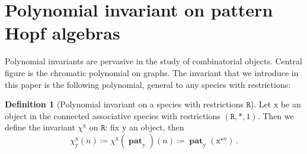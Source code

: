 \documentclass[submission]{FPSAC2023}
\theoremstyle{definition}
\newtheorem{defin}[thm]{Definition}
\DeclareMathOperator{\pat}{\mathbf{pat}}
\begin{document}

\section{Polynomial invariant on pattern Hopf algebras\label{sec:polynomial}}
Polynomial invariants are pervasive in the study of combinatorial objects.
Central figure is the chromatic polynomial on graphs. The invariant that we introduce in this paper is the following polynomial, general to any species with restrictions:

\begin{defin}[Polynomial invariant on a species with restrictions $\mathtt{R}$]
Let $\mathrm{x}$ be an object in the connected associative species with restrictions $(\mathtt{R}, \ast, 1)$.
Then we define the invariant $\chi^{\mathrm{x}}$ on $\mathtt{R}$: fix $\mathrm{y}$ an object, then
$$\chi^{\mathrm{x}}_{\mathrm{y}}(n) \coloneqq \chi^{\mathrm{x}}(\pat_{\mathrm{y}})(n) \coloneqq \pat_{\mathrm{y}}(\mathrm{x}^{\star n})\, . $$
\end{defin}
\end{document}
